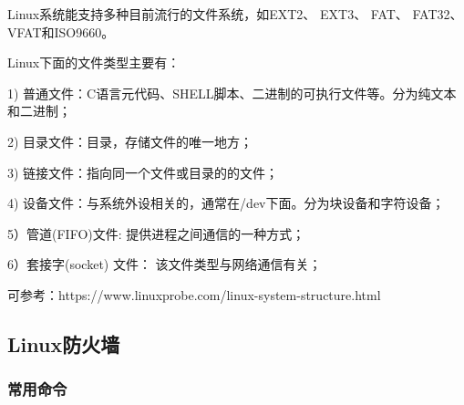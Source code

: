\documentclass[UTF8]{article}%
\begin{document}
Linux系统能支持多种目前流行的文件系统，如EXT2、 EXT3、 FAT、 FAT32、 VFAT和ISO9660。

Linux下面的文件类型主要有：

1) 普通文件：C语言元代码、SHELL脚本、二进制的可执行文件等。分为纯文本和二进制；

2) 目录文件：目录，存储文件的唯一地方；

3) 链接文件：指向同一个文件或目录的的文件；

4) 设备文件：与系统外设相关的，通常在/dev下面。分为块设备和字符设备；

5）管道(FIFO)文件: 提供进程之间通信的一种方式；

6）套接字(socket) 文件： 该文件类型与网络通信有关；

可参考：https://www.linuxprobe.com/linux-system-structure.html

\subsection{Linux防火墙}

\subsubsection{常用命令}
\end{document}
